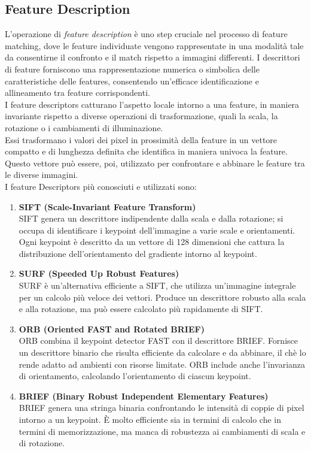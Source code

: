 \documentclass[12pt,a4paper,openright,twoside]{book}
\begin{document}
\subsection{Feature Description}
L'operazione di {\itshape feature description} è uno step cruciale nel processo di feature matching, dove le feature individuate vengono rappresentate in una modalità tale da consentirne il confronto e il match rispetto a immagini differenti. I descrittori di feature forniscono una rappresentazione numerica o simbolica delle caratteristiche delle features, consentendo un'efficace identificazione e allineamento tra feature corrispondenti.\\
I feature descriptors catturano l'aspetto locale intorno a una feature, in maniera invariante rispetto a diverse operazioni di trasformazione, quali la scala, la rotazione o i cambiamenti di illuminazione.\\
Essi trasformano i valori dei pixel in prossimità della feature in un vettore compatto e di lunghezza definita che identifica in maniera univoca la feature.\\
Questo vettore può essere, poi, utilizzato per confrontare e abbinare le feature tra le diverse immagini.\\
I feature Descriptors più conosciuti e utilizzati sono:
\begin{enumerate}

\item \textbf{SIFT (Scale-Invariant Feature Transform)}\\
SIFT genera un descrittore indipendente dalla scala e dalla rotazione; si occupa di identificare i keypoint dell'immagine a varie scale e orientamenti. Ogni keypoint è descritto da un vettore di 128 dimensioni che cattura la distribuzione dell'orientamento del gradiente intorno al keypoint.

\item \textbf{SURF (Speeded Up Robust Features)}\\
SURF è un'alternativa efficiente a SIFT, che utilizza un'immagine integrale per un calcolo più veloce dei vettori. Produce un descrittore robusto alla scala e alla rotazione, ma può essere calcolato più rapidamente di SIFT.

\item \textbf{ORB (Oriented FAST and Rotated BRIEF)}\\
ORB combina il keypoint detector FAST con il descrittore BRIEF. Fornisce un descrittore binario che risulta efficiente da calcolare e da abbinare, il chè lo rende adatto ad ambienti con risorse limitate. ORB include anche l'invarianza di orientamento, calcolando l'orientamento di ciascun keypoint.

\item \textbf{BRIEF (Binary Robust Independent Elementary Features)}\\
BRIEF genera una stringa binaria confrontando le intensità di coppie di pixel intorno a un keypoint. È molto efficiente sia in termini di calcolo che in termini di memorizzazione, ma manca di robustezza ai cambiamenti di scala e di rotazione.
\end{enumerate}
\end{document}
